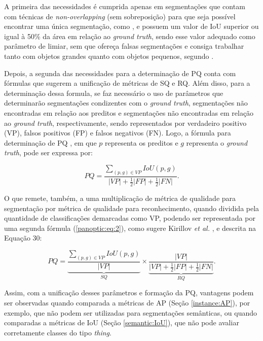 A primeira das necessidades é cumprida apenas em segmentações que contam com técnicas de \textit{non-overlapping} (sem sobreposição) para que seja possível encontrar uma única segmentação, como \cite{Neubeck2006}, e possuem um valor de IoU superior ou igual à 50\% da área em relação ao \textit{ground truth}, sendo esse valor adequado como parâmetro de limiar, sem que ofereça falsas segmentações e consiga trabalhar tanto com objetos grandes quanto com objetos pequenos, segundo \cite{Kirillov2019a}.

Depois, a segunda das necessidades para a determinação de PQ conta com fórmulas que sugerem a unificação de métricas de SQ e RQ. Além disso, para a determinação dessa formula, se faz necessário o uso de parâmetros que determinarão segmentações condizentes com o \textit{ground truth}, segmentações não encontradas em relação aos preditos e segmentações não encontradas em relação ao \textit{ground truth}, respectivamente, sendo representados por verdadeiro positivo (VP), falsos positivos (FP) e falsos negativos (FN). Logo, a fórmula para determinação de PQ \cite{Kirillov2019a}, em que $p$ representa os preditos e $g$ representa o \textit{ground truth}, pode ser expressa por:

\begin{equation}
\label{panoptic:eq:1}
    PQ = \frac{\sum _{(p,g) \in VP} IoU(p,g)}{|VP|+ \frac{1}{2}|FP| + \frac{1}{2}|FN|}.
\end{equation}

O que remete, também, a uma multiplicação de métrica de qualidade para segmentação por métrica de qualidade para reconhecimento, quando dividida pela quantidade de classificações demarcadas como VP, podendo ser representada por uma segunda fórmula (\ref{panoptic:eq:2}), como sugere Kirillov \textit{et al.} \cite{Kirillov2019a}, e descrita na Equação 30:

\begin{equation}
\label{panoptic:eq:2}
   PQ = \underbrace{\frac{\sum _{(p,g) \in VP} IoU(p,g)}{|VP|}}_{SQ} \times \underbrace{\frac{|VP|}{|VP|+ \frac{1}{2}|FP| + \frac{1}{2}|FN|}}_{RQ}.
\end{equation}

Assim, com a unificação desses parâmetros e formação da PQ, vantagens podem ser observadas quando comparada a métricas de AP (Seção \ref{instance:AP}), por exemplo, que não podem ser utilizadas para segmentações semânticas, ou quando comparadas a métricas de IoU (Seção \ref{semantic:IoU}), que não pode avaliar corretamente classes do tipo \textit{thing}.

